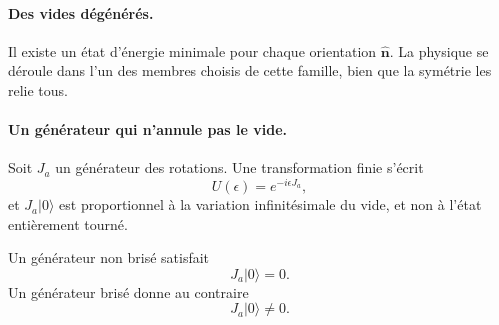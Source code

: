 \paragraph{Des vides dégénérés.}
Il existe un état d’énergie minimale pour chaque orientation \(\hat{\mathbf n}\). La physique se déroule dans l’un des membres choisis de cette famille, bien que la symétrie les relie tous.

\paragraph{Un générateur qui n’annule pas le vide.}
Soit \(J_a\) un générateur des rotations. Une transformation finie s’écrit
\begin{equation}
U(\epsilon)=e^{-i\epsilon J_a},
\end{equation}
et \(J_a|0\rangle\) est proportionnel à la variation infinitésimale du vide, et non à l’état entièrement tourné.

\begin{classroomqa}\end{classroomqa}

Un générateur non brisé satisfait
\begin{equation}
J_a|0\rangle=0.
\label{eq:l9-unbroken-generator}
\end{equation}
Un générateur brisé donne au contraire
\begin{equation}
J_a|0\rangle\neq0.
\label{eq:l9-broken-generator}
\end{equation}

\begin{classroomqa}\end{classroomqa}

\begin{classroomqa}\end{classroomqa}

